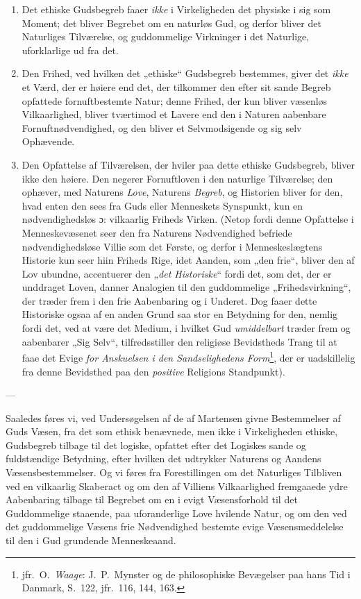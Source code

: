 \documentclass[12pt,a4paper]{book}
\newcommand{\opage}[1]{\marginnote{\footnotesize\textit{[#1]}}}
\begin{document}
\begin{enumerate}
\item Det ethiske Gudsbegreb faaer \emph{ikke} i Virkeligheden det physiske i sig som Moment; det
  bliver Begrebet om en naturløs Gud, og derfor bliver det Naturliges Tilværelse, og guddommelige Virkninger i det Naturlige, uforklarlige ud fra det.
\item Den Frihed, ved hvilken det „ethiske“ Gudsbegreb bestemmes, giver det \emph{ikke} et Værd,
  der er høiere end det, der tilkommer den efter sit sande Begreb opfattede fornuftbestemte
  Natur; denne Frihed, der kun bliver væsenløs Vilkaarlighed, bliver tværtimod et
  Lavere end den i Naturen aabenbare Fornuftnødvendighed, og den bliver et Selvmodsigende
  og sig selv Ophævende.
\item Den Opfattelse af Tilværelsen, der hviler paa dette ethiske Gudsbegreb, bliver ikke
  den høiere. Den negerer Fornuftloven i den naturlige Tilværelse; den ophæver, med Naturens \emph{Love}, Naturens \emph{Begreb}, og Historien bliver for den, hvad enten den sees
  fra Guds eller Menneskets Synspunkt, kun en nødvendighedsløs ɔ: vilkaarlig Friheds Virken. (Netop fordi denne Op\opage{94}fattelse i Menneskevæsenet seer den fra Naturens
  Nødvendighed befriede nødvendighedsløse Villie som det Første, og derfor i
  Menneskeslægtens Historie kun seer hiin Friheds Rige, idet Aanden, som „den frie“, bliver
  den af Lov ubundne, accentuerer den „\emph{det Historiske}“ fordi det, som det, der er
  unddraget Loven, danner Analogien til den guddommelige „Frihedsvirkning“, der træder frem
  i den frie Aabenbaring og i Underet. Dog faaer dette Historiske ogsaa af en anden Grund
  saa stor en Betydning for den, nemlig fordi det, ved at være det Medium, i hvilket Gud \emph{umiddelbart} træder frem og aabenbarer „Sig Selv“, tilfredsstiller den religiøse
  Bevidstheds Trang til at faae det Evige \emph{for Anskuelsen i den Sandselighedens Form}\footnote{jfr.\ O.\ \emph{Waage}: J.\ P.\ Mynster og de philosophiske Bevægelser paa hans
  Tid i Danmark, S.\ 122, jfr.\ 116, 144, 163.}, der er uadskillelig fra denne Bevidsthed
  paa den \emph{positive} Religions Standpunkt).
\end{enumerate}

\begin{center}---\end{center}

Saaledes føres vi, ved Undersøgelsen af de af Martensen givne Bestemmelser af Guds Væsen,
fra det som ethisk benævnede, men ikke i Virkeligheden ethiske, Gudsbegreb tilbage til det
logiske, opfattet efter det Logiskes sande og fuldstændige Betydning, efter hvilken det
udtrykker Naturens og Aandens Væsensbestemmelser. Og vi føres fra Forestillingen om det
Naturliges Tilbliven ved en vilkaarlig Skaberact og om den af Villiens Vilkaarlighed
fremgaaede ydre Aabenbaring tilbage til Begrebet om en i evigt Væsensforhold til det
Guddommelige staaende, paa uforanderlige Love hvilende Natur, og om den ved det
guddommelige Væsens frie Nødvendighed bestemte evige Væsensmeddelelse til den i Gud
grundende Menneskeaand.
\end{document}
